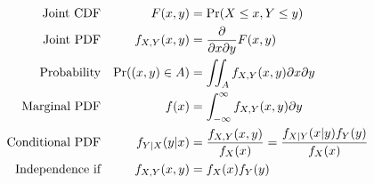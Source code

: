 
\begin{slide}
\begin{align*}
\text{Joint CDF} &&F(x,y) &= \Pr(X\leq x, Y\leq y)\\
\text{Joint PDF} &&f_{X,Y}(x,y) &= {\partial \over \partial x \partial y}F(x,y)\\
\text{Probability} &&\Pr((x,y)\in A)&=\iint_{A}f_{X,Y}(x,y)\partial x\partial y\\
\text{Marginal PDF} &&f(x) &= \int_{-\infty}^{\infty}f_{X,Y}(x,y)\partial y\\
\text{Conditional PDF} &&f_{Y|X}(y|x) &= {f_{X,Y}(x,y) \over f_{X}(x)} = {f_{X|Y}(x|y)  f_{Y}(y) \over f_{X}(x)}\\
\text{Independence if} &&f_{X,Y}(x,y) &= f_{X}(x)f_{Y}(y)
\end{align*}
\end{slide}
